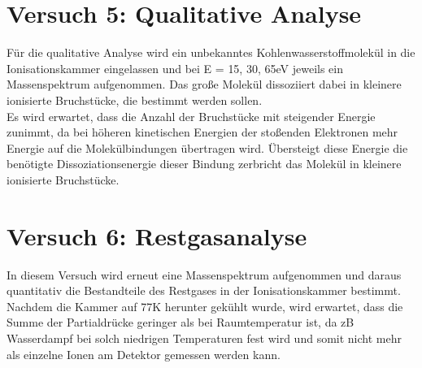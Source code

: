 \section{Versuch 5: Qualitative Analyse}

Für die qualitative Analyse wird ein unbekanntes Kohlenwasserstoffmolekül in die Ionisationskammer eingelassen und bei E = {15, 30, 65}\;eV jeweils ein Massenspektrum aufgenommen.
Das große Molekül dissoziiert dabei in kleinere ionisierte Bruchstücke, die bestimmt werden sollen.\\
Es wird erwartet, dass die Anzahl der Bruchstücke mit steigender Energie zunimmt, da bei höheren kinetischen Energien der stoßenden Elektronen mehr Energie auf die Molekülbindungen übertragen wird. 
Übersteigt diese Energie die benötigte Dissoziationsenergie dieser Bindung zerbricht das Molekül in kleinere ionisierte Bruchstücke.

\section{Versuch 6: Restgasanalyse}

In diesem Versuch wird erneut eine Massenspektrum aufgenommen und daraus quantitativ die Bestandteile des Restgases in der Ionisationskammer bestimmt.
Nachdem die Kammer auf 77\;K herunter gekühlt wurde, wird erwartet, dass die Summe der Partialdrücke geringer als bei Raumtemperatur ist, da zB Wasserdampf bei solch niedrigen Temperaturen fest wird und somit nicht mehr als einzelne Ionen am Detektor gemessen werden kann.